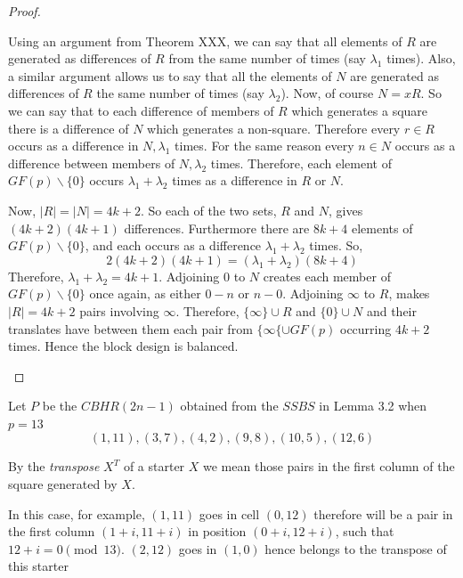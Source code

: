 \documentclass[
  11pt,
  a4paper]{book}
\newcounter{example}
\begin{document}
\begin{proof}
\begin{enumerate}
{    Using an argument from Theorem XXX, we can say that
    all elements of $R$ are generated as differences of $R$
    from the same number of times (say $\lambda _1$ times).
    Also, a similar argument allows us to say that all the
    elements of $N$ are generated as differences of $R$ the
    same number of times (say $\lambda _2$). Now, of course
    $N = xR$. So we can say that to each difference of
    members of $R$ which generates a square there is a
    difference of $N$ which generates a non-square.
    Therefore every $r \in R$ occurs as a difference in
    $N, \lambda _1$ times. For the same reason every
    $n \in N$ occurs as a difference between members of
    $N, \lambda _2$ times. Therefore, each element of
    $GF(p) \backslash \{0\}$ occurs $\lambda _1 + \lambda _2$
    times as a difference in $R$ or $N$.
    
    Now, $|R| = |N| = 4k + 2$. So each of the two sets, $R$
    and $N$, gives $(4k + 2)(4k + 1)$ differences. Furthermore
    there are $8k + 4$ elements of $GF(p) \backslash \{0\}$,
    and each occurs as a difference
    $\lambda _1 + \lambda _2$ times. So,
    \begin{equation}
    2(4k + 2)(4k + 1) = (\lambda _1 + \lambda _2)(8k + 4)
    \end{equation}
    Therefore, $\lambda _1 + \lambda _2 = 4k + 1$.
    Adjoining 0 to $N$ creates each member of
    $GF(p) \backslash \{0\}$ once again, as either $0-n$ or
    $n-0$.
    Adjoining $\infty$ to $R$, makes $|R| = 4k + 2$ pairs
    involving $\infty$. Therefore, $\{\infty\} \cup R$ and
    $\{0\} \cup N$ and their translates have between them
    each pair from $\{\infty\{ \cup GF(p)$ occurring $4k + 2$
    times. Hence the block design is balanced.}
\end{enumerate}
\end{proof}

\begin{example}
Let $P$ be the $CBHR(2n - 1)$ obtained from the $SSBS$ in
Lemma 3.2 when $p = 13$
\begin{equation}
  (1, 11), (3, 7), (4, 2), (9, 8), (10, 5), (12, 6)
\end{equation}
\end{example}

By the \emph{transpose} \(X^T\) of a starter \(X\) we mean those pairs
in the first column of the square generated by \(X\).

In this case, for example, \((1, 11)\) goes in cell \((0, 12)\)
therefore will be a pair in the first column \((1 + i, 11 + i)\) in
position \((0 + i, 12 + i)\), such that \(12 + i = 0\pmod{13}\).
\((2, 12)\) goes in \((1, 0)\) hence belongs to the transpose of this
starter
\end{document}
